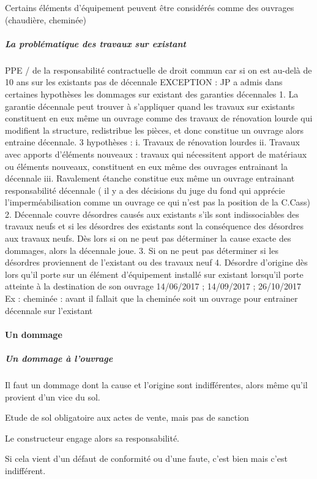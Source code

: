 				Certains éléments d’équipement peuvent être considérés comme des ouvrages (chaudière, cheminée)

				\subparagraph{La problématique des travaux sur existant}

				PPE / de la responsabilité contractuelle de droit commun car si on est au-delà de 10 ans sur les existants pas de décennale
				EXCEPTION : JP a admis dans certaines hypothèses les dommages sur existant des garanties décennales
				1.	La garantie décennale peut trouver à s’appliquer quand les travaux sur existants constituent en eux même un ouvrage comme des travaux de rénovation lourde qui modifient la structure, redistribue les pièces, et donc constitue un ouvrage alors entraine décennale.
				3 hypothèses :
				i.	Travaux de rénovation lourdes
				ii.	Travaux avec apports d’éléments nouveaux : travaux qui nécessitent apport de matériaux ou éléments nouveaux, constituent en eux même des ouvrages entrainant la décennale
				iii.	Ravalement étanche constitue eux même un ouvrage entrainant responsabilité décennale ( il y a des décisions du juge du fond qui apprécie l’imperméabilisation comme un ouvrage ce qui n’est pas la position de la C.Cass)
				2.	Décennale couvre désordres causés aux existants s’ils sont indissociables des travaux neufs et si les désordres des existants sont la conséquence des désordres aux travaux neufs. Dès lors si on ne peut pas déterminer la cause exacte des dommages, alors la décennale joue.
				3.	Si on ne peut pas déterminer si les désordres proviennent de l’existant ou des travaux neuf
				4.	Désordre d’origine dès lors qu’il porte sur un élément d’équipement installé sur existant lorsqu’il porte atteinte à la destination de son ouvrage 14/06/2017 ; 14/09/2017 ; 26/10/2017
				Ex : cheminée : avant il fallait que la cheminée soit un ouvrage pour entrainer décennale sur l’existant


			\paragraph{Un dommage}

				\subparagraph{Un dommage à l'ouvrage}

				Il faut un dommage dont la cause et l’origine sont indifférentes, alors même qu’il provient d’un vice du sol.

				Etude de sol obligatoire aux actes de vente, mais pas de sanction

				Le constructeur engage alors sa responsabilité.

				Si cela vient d’un défaut de conformité ou d’une faute, c’est bien mais c’est indifférent.

